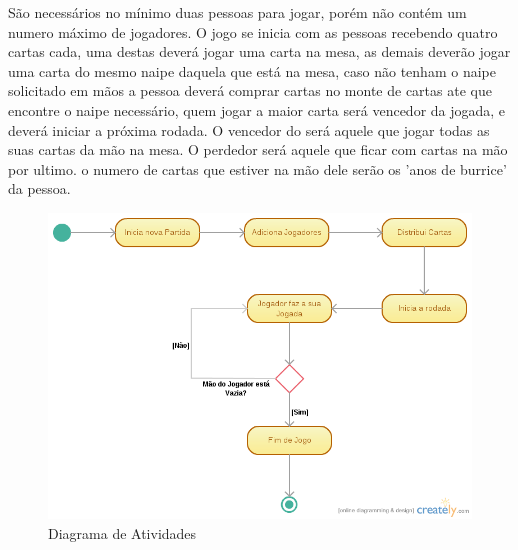 \documentclass[12pt, a4paper]{article}
\begin{document}
  São necessários no mínimo duas pessoas para jogar, porém não contém um numero máximo de jogadores. O jogo se inicia com as pessoas recebendo quatro cartas cada, uma destas deverá jogar uma carta na mesa, as demais deverão jogar uma carta do mesmo naipe daquela que está na mesa, caso não tenham o naipe solicitado em mãos a pessoa deverá comprar cartas no monte de cartas ate que encontre o naipe necessário, quem jogar a maior carta será  vencedor da jogada, e deverá iniciar a próxima rodada. O vencedor do será aquele que jogar todas as suas cartas da mão na mesa. O perdedor será aquele que ficar com cartas na mão por ultimo. o numero de cartas que estiver na mão dele serão os 'anos de burrice' da pessoa.


  \begin{figure}[!htb]
   \centering
   \includegraphics[scale=0.5]{../DiagramaAtividadesBurro}
   \caption{Diagrama de Atividades}
   \label{Rotulo}
  \end{figure}
\end{document}
